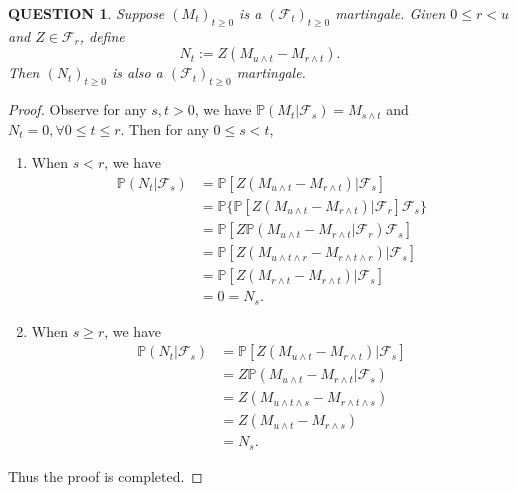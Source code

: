\documentclass[12pt]{article}
\renewcommand{\(}{\left(}%
\renewcommand{\)}{\right)}%
\renewcommand{\[}{\left[}%
\renewcommand{\]}{\right]}%
\newcommand{\p}{\mathbb{P}}
\newcommand{\f}{\mathscr{F}}
\newtheorem{question}{QUESTION}[section]}
\newtheorem{proof}{Proof.}}
\begin{document}
  \begin{question}
  	Suppose $(M_t)_{t\geq 0}$ is a $(\f_t)_{t\geq 0}$ martingale. Given $0\leq r<u$ and $Z\in\f_r$, define
  	\begin{equation*}
  		N_t:=Z(M_{u\wedge t}-M_{r\wedge t}).
  	\end{equation*}
  	Then $(N_t)_{t\geq 0}$ is also a $(\f_t)_{t\geq 0}$ martingale.
  \end{question}
  \begin{proof}
  	Observe for any $s,t>0$, we have $\p(M_t|\f_s)=M_{s\wedge t}$ and $N_t=0,\forall 0\leq t\leq r$. Then for any $0\leq s<t$,
  	\begin{enumerate}
  		\item When $s<r$, we have
  		\begin{equation*}
  			\begin{split}
  				\p(N_t|\f_s)&=\p[Z(M_{u\wedge t}-M_{r\wedge t})|\f_s]\\
  				&=\p\{\p[Z(M_{u\wedge t}-M_{r\wedge t})|\f_r]\f_s\}\\
  				&=\p[Z\p(M_{u\wedge t}-M_{r\wedge t}|\f_r)\f_s]\\
  				&=\p[Z(M_{u\wedge t\wedge r}-M_{r\wedge t\wedge r})|\f_s]\\
  				&=\p[Z(M_{r\wedge t}-M_{r\wedge t})|\f_s]\\
  				&=0=N_s.
  			\end{split}
  		\end{equation*}
  		\item When $s\geq r$, we have
  		\begin{equation*}
  			\begin{split}
  				\p(N_t|\f_s)&=\p[Z(M_{u\wedge t}-M_{r\wedge t})|\f_s]\\
  				&=Z\p(M_{u\wedge t}-M_{r\wedge t}|\f_s)\\
  				&=Z(M_{u\wedge t\wedge s}-M_{r\wedge t\wedge s})\\
  				&=Z(M_{u\wedge t}-M_{r\wedge s})\\
  				&=N_s.
  			\end{split}
  		\end{equation*}
  	\end{enumerate}
  	Thus the proof is completed.
  \end{proof}
  
\end{document}
